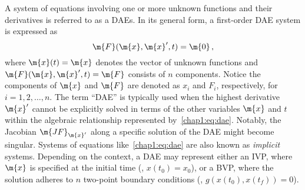 A system of equations involving one or more unknown functions and their derivatives is referred to as a \acp{DAE}. In its general form, a first-order \ac{DAE} system is expressed as
%
\begin{equation}
  \m{F}(\m{x}, \m{x}^{\prime}, t) = \m{0} \, \text{,}
  \label{chap1:eq:dae}
\end{equation}
%
where $\m{x}(t) = \m{x}$ denotes the vector of unknown functions and $\m{F}(\m{x}, \m{x}^{\prime}, t) = \m{F}$ consists of $n$ components. Notice the components of $\m{x}$ and $\m{F}$ are denoted as $x_i$ and $F_i$, respectively, for $i = 1, 2, \dots, n$. The term ``\ac{DAE}'' is typically used when the highest derivative $\m{x}^{\prime}$ cannot be explicitly solved in terms of the other variables $\m{x}$ and $t$ within the algebraic relationship represented by~\eqref{chap1:eq:dae}. Notably, the Jacobian $\m{JF}_{\m{x}^{\prime}}$ along a specific solution of the \ac{DAE} might become singular. Systems of equations like~\eqref{chap1:eq:dae} are also known as \emph{implicit} systems. Depending on the context, a \ac{DAE} may represent either an \ac{IVP}, where $\m{x}$ is specified at the initial time (\eg{}, $x(t_0) = x_0$), or a \ac{BVP}, where the solution adheres to $n$ two-point boundary conditions (\eg{}, $g(x(t_0), x(t_f)) = 0$).

